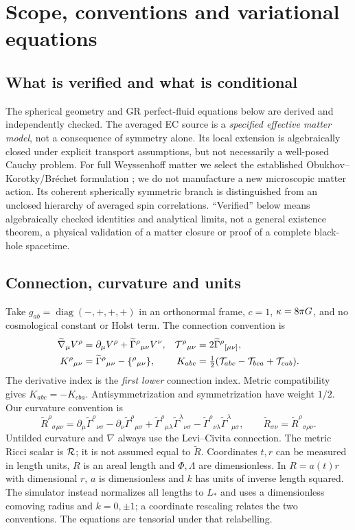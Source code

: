 \section{Scope, conventions and variational equations}
\subsection{What is verified and what is conditional}
The spherical geometry and GR perfect-fluid equations below are derived and independently checked. The averaged EC source is a \emph{specified effective matter model}, not a consequence of symmetry alone. Its local extension is algebraically closed under explicit transport assumptions, but not necessarily a well-posed Cauchy problem. For full Weyssenhoff matter we select the established Obukhov--Korotky/Br\'echet formulation \cite{OK,BHL}; we do not manufacture a new microscopic matter action. Its coherent spherically symmetric branch is distinguished from an unclosed hierarchy of averaged spin correlations. ``Verified'' below means algebraically checked identities and analytical limits, not a general existence theorem, a physical validation of a matter closure or proof of a complete black-hole spacetime.

\subsection{Connection, curvature and units}
Take $g_{ab}=\operatorname{diag}(-,+,+,+)$ in an orthonormal frame, $c=1$, $\kappa=8\pi G$, and no cosmological constant or Holst term. The connection convention is
\begin{align}
 \widetilde\nabla_\mu V^\rho&=\partial_\mu V^\rho+\widetilde\Gamma^\rho{}_{\mu\nu}V^\nu, &
 \mathcal T^\rho{}_{\mu\nu}&=2\widetilde\Gamma^\rho{}_{[\mu\nu]},\\
 K^\rho{}_{\mu\nu}&=\widetilde\Gamma^\rho{}_{\mu\nu}-\{^\rho{}_{\mu\nu}\}, &
 K_{abc}&=\tfrac12(\mathcal T_{abc}-\mathcal T_{bca}+\mathcal T_{cab}).\label{eq:contortion}
\end{align}
The derivative index is the \emph{first lower} connection index. Metric compatibility gives $K_{abc}=-K_{cba}$. Antisymmetrization and symmetrization have weight $1/2$. Our curvature convention is
\begin{equation}
 \widetilde R^\rho{}_{\sigma\mu\nu}=\partial_\mu\widetilde\Gamma^\rho{}_{\nu\sigma}-\partial_\nu\widetilde\Gamma^\rho{}_{\mu\sigma}
 +\widetilde\Gamma^\rho{}_{\mu\lambda}\widetilde\Gamma^\lambda{}_{\nu\sigma}
 -\widetilde\Gamma^\rho{}_{\nu\lambda}\widetilde\Gamma^\lambda{}_{\mu\sigma},
 \qquad \widetilde R_{\sigma\nu}=\widetilde R^\rho{}_{\sigma\rho\nu}.
\end{equation}
Untilded curvature and $\nabla$ always use the Levi--Civita connection. The metric Ricci scalar is $\mathcal R$; it is not assumed equal to $\widetilde R$. Coordinates $t,r$ can be measured in length units, $R$ is an areal length and $\Phi,\Lambda$ are dimensionless. In $R=a(t)r$ with dimensional $r$, $a$ is dimensionless and $k$ has units of inverse length squared. The simulator instead normalizes all lengths to $L_*$ and uses a dimensionless comoving radius and $k=0,\pm1$; a coordinate rescaling relates the two conventions. The equations are tensorial under that relabelling.


